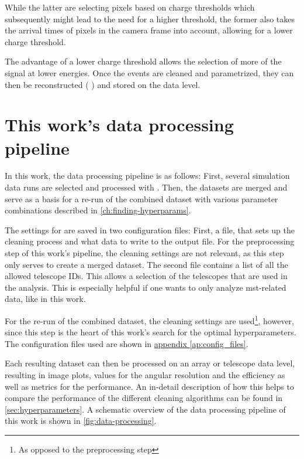 While the latter are selecting pixels based on charge thresholds which
subsequently might lead to the need for a higher threshold, the former also takes the arrival times of
pixels in the camera frame into account, allowing for a lower charge threshold.

The advantage of a lower charge threshold allows the selection of more of the signal at lower energies.
Once the events are cleaned and parametrized, they can then be reconstructed (\dlob{} \rightarrow \dlt{})
and stored on the \dlt{} data level.


\section{This work's data processing pipeline}
\label{sec:pipeline}
In this work, the data processing pipeline is as follows: First, several simulation data runs are
selected and processed with \ctapipe{}. Then, the datasets are merged and serve as a basis for a re-run
of the combined dataset with various parameter combinations described in \autoref{ch:finding-hyperparams}.

The settings for \ctapipe{} are saved in two configuration files: First, a file, that sets up the
cleaning process and what data to write to the output file. For the preprocessing step of this work's
pipeline, the cleaning settings are not relevant, as this step only serves to create a merged dataset.
The second file contains a list of all the allowed telescope IDs. This allows a selection of the telescopes
that are used in the analysis. This is especially helpful if one wants to only analyze \gls{mst}-related
data, like in this work.

For the re-run of the combined dataset, the cleaning settings are used\footnote{As opposed to the preprocessing step},
however, since this step is the heart of this work's search for the optimal hyperparameters.
The configuration files used are shown in \hyperref[ap:config_files]{appendix \ref{ap:config_files}}.

Each resulting dataset can then be processed on an array or telescope data level, resulting in
\dloa{} image plots, values for the angular resolution and the efficiency as well as metrics for the
performance. An in-detail description of how this helps to compare the performance of the different
cleaning algorithms can be found in \autoref{sec:hyperparameters}. A schematic overview of the data
processing pipeline of this work is shown in \autoref{fig:data-processing}.

